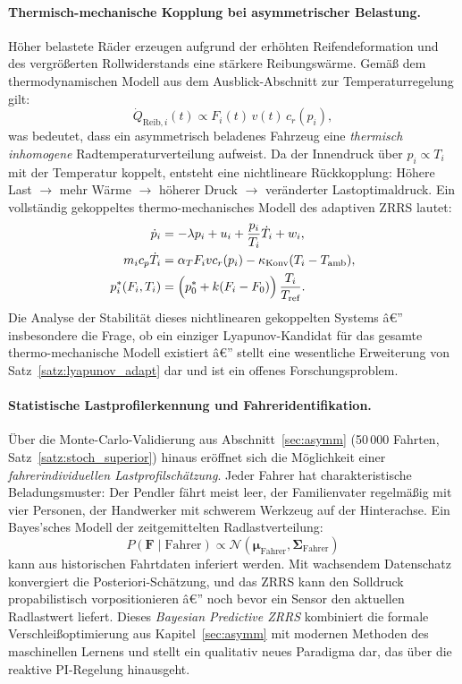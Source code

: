 ﻿\documentclass[a4paper,12pt]{article}
\theoremstyle{definition}
\begin{document}
\paragraph{Thermisch-mechanische Kopplung bei asymmetrischer Belastung.}
Höher belastete Räder erzeugen aufgrund der erhöhten Reifendeformation
und des vergrößerten Rollwiderstands eine stärkere Reibungswärme. Gemäß
dem thermodynamischen Modell aus dem Ausblick-Abschnitt zur
Temperaturregelung gilt:
\[
    \dot{Q}_{\text{Reib},i}(t) \propto F_i(t)\,v(t)\,c_r(p_i),
\]
was bedeutet, dass ein asymmetrisch beladenes Fahrzeug eine \emph{thermisch
inhomogene} Radtemperaturverteilung aufweist. Da der Innendruck über
$p_i \propto T_i$ mit der Temperatur koppelt, entsteht eine nichtlineare
Rückkopplung: Höhere Last $\to$ mehr Wärme $\to$ höherer Druck $\to$
veränderter Lastoptimaldruck. Ein vollständig gekoppeltes
thermo-mechanisches Modell des adaptiven ZRRS lautet:
\begin{align*}
    \dot{p}_i &= -\lambda p_i + u_i + \frac{p_i}{T_i}\dot{T}_i + w_i,\\
    m_i c_p \dot{T}_i &= \alpha_T F_i v c_r(p_i)
    - \kappa_{\text{Konv}}(T_i - T_{\text{amb}}),\\
    p^*_i(F_i, T_i) &= \Bigl(p^*_0 + k(F_i - F_0)\Bigr)\,\frac{T_i}{T_{\text{ref}}}.
\end{align*}
Die Analyse der Stabilität dieses nichtlinearen gekoppelten Systems â€”
insbesondere die Frage, ob ein einziger Lyapunov-Kandidat für das gesamte
thermo-mechanische Modell existiert â€” stellt eine wesentliche Erweiterung
von Satz~\ref{satz:lyapunov_adapt} dar und ist ein offenes
Forschungsproblem.

\paragraph{Statistische Lastprofilerkennung und Fahreridentifikation.}
Über die Monte-Carlo-Validierung aus Abschnitt~\ref{sec:asymm}
(50\,000 Fahrten, Satz~\ref{satz:stoch_superior}) hinaus eröffnet sich
die Möglichkeit einer \emph{fahrerindividuellen Lastprofilschätzung}.
Jeder Fahrer hat charakteristische Beladungsmuster: Der Pendler fährt meist
leer, der Familienvater regelmäßig mit vier Personen, der Handwerker mit
schwerem Werkzeug auf der Hinterachse. Ein Bayes'sches Modell der
zeitgemittelten Radlastverteilung:
\[
    P(\mathbf{F} \mid \text{Fahrer}) \propto
    \mathcal{N}(\boldsymbol{\mu}_{\text{Fahrer}}, \boldsymbol{\Sigma}_{\text{Fahrer}})
\]
kann aus historischen Fahrtdaten inferiert werden. Mit wachsendem
Datenschatz konvergiert die Posteriori-Schätzung, und das ZRRS kann den
Solldruck propabilistisch vorpositionieren â€” noch bevor ein Sensor den
aktuellen Radlastwert liefert. Dieses \emph{Bayesian Predictive ZRRS}
kombiniert die formale Verschleißoptimierung aus Kapitel~\ref{sec:asymm}
mit modernen Methoden des maschinellen Lernens und stellt ein qualitativ
neues Paradigma dar, das über die reaktive PI-Regelung hinausgeht.
\end{document}
